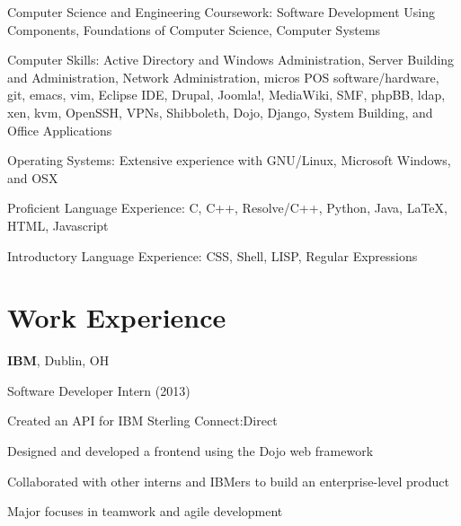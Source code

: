 \documentclass[letterpaper]{resume}
\begin{document}
\begin{compactitem}
	\item Computer Science and Engineering Coursework: Software Development Using Components, Foundations of Computer Science, Computer Systems

	\item Computer Skills: Active Directory and Windows Administration, Server Building and Administration, Network Administration, micros POS software/hardware, git, emacs, vim, Eclipse IDE, Drupal, Joomla!, MediaWiki, SMF, phpBB, ldap, xen, kvm, OpenSSH, VPNs, Shibboleth, Dojo, Django, System Building, and Office Applications

	\item Operating Systems: Extensive experience with GNU/Linux, Microsoft Windows, and OSX

	\item Proficient Language Experience: C, C++, Resolve/C++, Python, Java, LaTeX, HTML, Javascript
	\item Introductory Language Experience: CSS, Shell, LISP, Regular Expressions

\end{compactitem}


\section{Work Experience}
\textbf{IBM}, Dublin, OH

Software Developer Intern (2013)
\begin{compactitem}
	\item Created an API for IBM Sterling Connect:Direct

	\item Designed and developed a frontend using the Dojo web framework

	\item Collaborated with other interns and IBMers to build an enterprise-level product

	\item Major focuses in teamwork and agile development
\end{compactitem}

~

%
%
\end{document}
